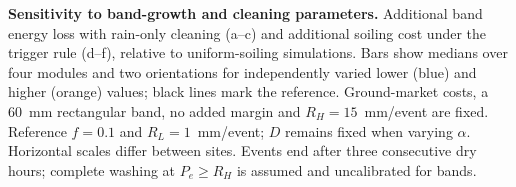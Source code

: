 \caption{\textbf{Sensitivity to band-growth and cleaning parameters.} Additional band energy loss with rain-only cleaning (a--c) and additional soiling cost under the trigger rule (d--f), relative to uniform-soiling simulations. Bars show medians over four modules and two orientations for independently varied lower (blue) and higher (orange) values; black lines mark the reference. Ground-market costs, a 60~mm rectangular band, no added margin and $R_H=15$~mm/event are fixed. Reference $f=0.1$ and $R_L=1$~mm/event; $D$ remains fixed when varying $\alpha$. Horizontal scales differ between sites. Events end after three consecutive dry hours; complete washing at $P_e\geq R_H$ is assumed and uncalibrated for bands.\label{fig:ed-parameter-sensitivity}}
